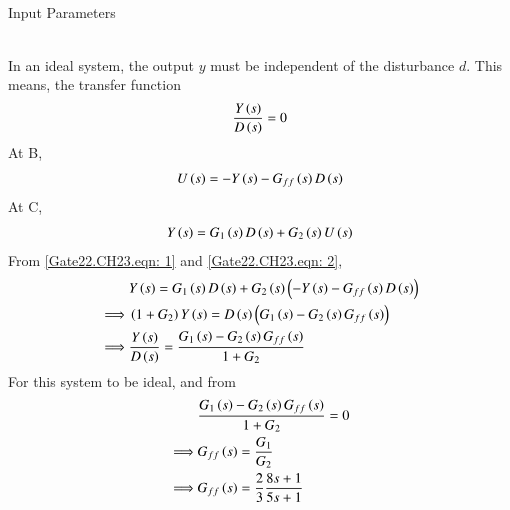 \documentclass[journal,12pt,twocolumn]{IEEEtran}
\theoremstyle{remark}
\begin{document}
\solution \\
\begin{table}[h!]
    \centering
    
    \caption{Input Parameters}
    \label{Gate22.CH23.tab: 1}
\end{table}
\\
In an ideal system, the output $y$ must be independent of the disturbance $d$. This means, the transfer function $$\frac{Y\left(s\right)}{D\left(s\right)}=0$$
At B, 
\begin{align}
    U\left(s\right)=-Y\left(s\right)-G_{ff}\left(s\right)D\left(s\right) \label{Gate22.CH23.eqn: 1}
\end{align}
At C,
\begin{align}
    Y\left(s\right)=G_1\left(s\right)D\left(s\right)+G_2\left(s\right)U\left(s\right) \label{Gate22.CH23.eqn: 2}
\end{align}
From \eqref{Gate22.CH23.eqn: 1} and \eqref{Gate22.CH23.eqn: 2},
\begin{align}
    &Y\left(s\right)=G_1\left(s\right)D\left(s\right)+G_2\left(s\right)\left(-Y\left(s\right)-G_{ff}\left(s\right)D\left(s\right)\right)\\
    \implies& \left(1+G_2\right)Y\left(s\right)=D\left(s\right)\left(G_1\left(s\right)-G_2\left(s\right)G_{ff}\left(s\right)\right)\\
    \implies& \frac{Y\left(s\right)}{D\left(s\right)}=\frac{G_1\left(s\right)-G_2\left(s\right)G_{ff}\left(s\right)}{1+G_2}
\end{align}
For this system to be ideal, and from  
\begin{align}
    &\frac{G_1\left(s\right)-G_2\left(s\right)G_{ff}\left(s\right)}{1+G_2}=0\\
    \implies& G_{ff}\left(s\right) = \frac{G_1}{G_2}\\
    \implies& G_{ff}\left(s\right) = \frac{2}{3}\frac{8s+1}{5s+1}
\end{align}
\end{document}
